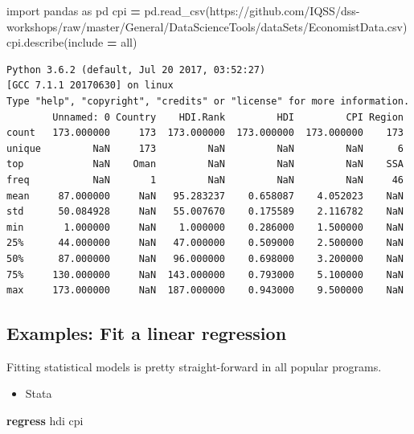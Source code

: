 \documentclass[
]{book}
\newenvironment{Shaded}{\begin{snugshade}}{\end{snugshade}}
\newcommand{\ImportTok}[1]{#1}
\newcommand{\KeywordTok}[1]{\textcolor[rgb]{0.13,0.29,0.53}{\textbf{#1}}}
\newcommand{\NormalTok}[1]{#1}
\newcommand{\OperatorTok}[1]{\textcolor[rgb]{0.81,0.36,0.00}{\textbf{#1}}}
\newcommand{\StringTok}[1]{\textcolor[rgb]{0.31,0.60,0.02}{#1}}
\providecommand{\tightlist}{%
  \setlength{\itemsep}{0pt}\setlength{\parskip}{0pt}}
\begin{document}
\begin{Shaded}
\begin{Highlighting}[]
\ImportTok{import}\NormalTok{ pandas }\ImportTok{as}\NormalTok{ pd}
\NormalTok{cpi }\OperatorTok{=}\NormalTok{ pd.read\_csv(}\StringTok{\textquotesingle{}https://github.com/IQSS/dss{-}workshops/raw/master/General/DataScienceTools/dataSets/EconomistData.csv\textquotesingle{}}\NormalTok{)}
\NormalTok{cpi.describe(include }\OperatorTok{=} \StringTok{\textquotesingle{}all\textquotesingle{}}\NormalTok{)}
\end{Highlighting}
\end{Shaded}

\begin{verbatim}
Python 3.6.2 (default, Jul 20 2017, 03:52:27) 
[GCC 7.1.1 20170630] on linux
Type "help", "copyright", "credits" or "license" for more information.
        Unnamed: 0 Country    HDI.Rank         HDI         CPI Region
count   173.000000     173  173.000000  173.000000  173.000000    173
unique         NaN     173         NaN         NaN         NaN      6
top            NaN    Oman         NaN         NaN         NaN    SSA
freq           NaN       1         NaN         NaN         NaN     46
mean     87.000000     NaN   95.283237    0.658087    4.052023    NaN
std      50.084928     NaN   55.007670    0.175589    2.116782    NaN
min       1.000000     NaN    1.000000    0.286000    1.500000    NaN
25%      44.000000     NaN   47.000000    0.509000    2.500000    NaN
50%      87.000000     NaN   96.000000    0.698000    3.200000    NaN
75%     130.000000     NaN  143.000000    0.793000    5.100000    NaN
max     173.000000     NaN  187.000000    0.943000    9.500000    NaN
\end{verbatim}

\hypertarget{examples-fit-a-linear-regression}{%
\subsection{Examples: Fit a linear regression}\label{examples-fit-a-linear-regression}}

Fitting statistical models is pretty straight-forward in all popular programs.

\begin{itemize}
\tightlist
\item
  Stata
\end{itemize}

\begin{Shaded}
\begin{Highlighting}[]
\KeywordTok{regress}\NormalTok{ hdi cpi}
\end{Highlighting}
\end{Shaded}
\end{document}
